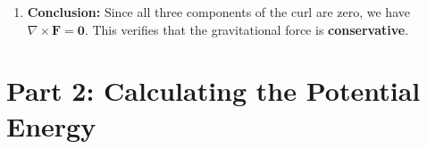 \documentclass[11pt, a4paper]{article} %
\begin{document}
\begin{enumerate}
\begin{itemize}
        \item \textbf{$\hat{\mathbf{\phi}}$ component:}
        Here we must evaluate $\frac{\partial}{\partial \theta}(F_r)$. Since $F_r = -GMm/r^2$ does not depend on $\theta$, this partial derivative is also zero.
        $$\frac{1}{r} \left[ \frac{\partial}{\partial r}(r \cdot 0) - \frac{\partial}{\partial \theta}\left(-\frac{GMm}{r^2}\right) \right] = \frac{1}{r} [0 - 0] = 0$$
    \end{itemize}

    \item \textbf{Conclusion:}
    Since all three components of the curl are zero, we have $\nabla \times \mathbf{F} = \mathbf{0}$. This verifies that the gravitational force is \textbf{conservative}.
\end{enumerate}

\hrulefill

\section*{Part 2: Calculating the Potential Energy}
\end{document}
